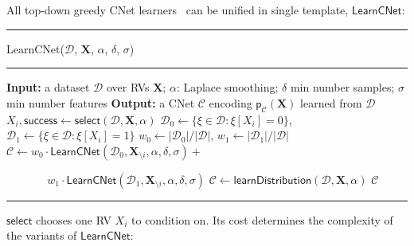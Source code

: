 \documentclass[final]{beamer}
\begin{document}
\begin{frame}{}
\begin{textblock}{17.5}
    All top-down greedy CNet learners~\cite{Rahman2014,DiMauro2015a}
    can be unified in single template, $\mathsf{LearnCNet}$:
 \begin{center}  
  \begin{minipage}{0.9\linewidth}
    \vspace{10pt}
        \scriptsize
        {\hrule\flushleft\textsf{LearnCNet}($\mathcal{D}$, $\mathbf{X}$, $\alpha$,
        $\delta$, $\sigma$)\\\hrule}
  \begin{algorithmic}[1]
    \State \textbf{Input:} a dataset $\mathcal{D}$ over RVs $\mathbf{X}$; $\alpha$: Laplace
    smoothing; $\delta$
    min number samples; $\sigma$ min number features
    \State  \textbf{Output:}  a CNet $\mathcal{C}$ encoding  $\mathsf{p}_{\mathcal{C}}(\textbf{X})$ learned from $\mathcal D$
    \State $X_i, \mathsf{success} \leftarrow  \mathsf{select}(\mathcal D, \mathbf X, \alpha)$
    \State $\mathcal D_0 \leftarrow \{\xi \in \mathcal D: \xi[X_i]=0 \}$, $\mathcal D_1 \leftarrow \{\xi \in \mathcal D: \xi[X_i]=1 \}$
    \State $w_0 \leftarrow |\mathcal D_0| / |\mathcal D|$, $w_1 \leftarrow |\mathcal   D_1| / |\mathcal D|$
    \State $\mathcal{C} \leftarrow
    w_0\cdot\mathsf{LearnCNet}(\mathcal D_0, \mathbf X_{\setminus i},
    \alpha, \delta, \sigma) +$\par
     $\quad\quad\quad\ \ \  w_1 \cdot\mathsf{LearnCNet}(\mathcal D_1, \mathbf X_{\setminus i}, \alpha, \delta, \sigma) $
    \EndIf
    \Else 
    \State $\mathcal{C} \leftarrow \mathsf{learnDistribution}(\mathcal D, \mathbf X, \alpha)$
    \EndIf
    \State \Return $\mathcal{C}$
  \end{algorithmic}
  \hrule
  
\end{minipage}
\end{center}
\vspace{10pt}
    $\mathsf{select}$ chooses one RV $X_{i}$ to condition on. Its cost
    determines the complexity of the variants of $\mathsf{LearnCNet}$:
    \vspace{10pt}


\end{textblock}
\end{frame}
\end{document}
